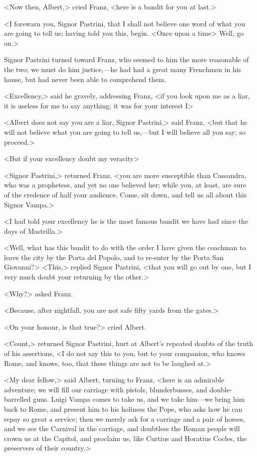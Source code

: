  <Now then, Albert,> cried Franz, <here is a bandit for you at last.> 

 <I forewarn you, Signor Pastrini, that I shall not believe one word of what you are going to tell us; having told you this, begin. <Once upon a time\longdash> Well, go on.> 

 Signor Pastrini turned toward Franz, who seemed to him the more reasonable of the two; we must do him justice,—he had had a great many Frenchmen in his house, but had never been able to comprehend them. 

 <Excellency,> said he gravely, addressing Franz, <if you look upon me as a liar, it is useless for me to say anything; it was for your interest I\longdash> 

 <Albert does not say you are a liar, Signor Pastrini,> said Franz, <but that he will not believe what you are going to tell us,—but I will believe all you say; so proceed.> 

 <But if your excellency doubt my veracity\longdash> 

 <Signor Pastrini,> returned Franz, <you are more susceptible than Cassandra, who was a prophetess, and yet no one believed her; while you, at least, are sure of the credence of half your audience. Come, sit down, and tell us all about this Signor Vampa.> 

 <I had told your excellency he is the most famous bandit we have had since the days of Mastrilla.> 

 <Well, what has this bandit to do with the order I have given the coachman to leave the city by the Porta del Popolo, and to re-enter by the Porta San Giovanni?>  <This,> replied Signor Pastrini, <that you will go out by one, but I very much doubt your returning by the other.> 

 <Why?> asked Franz. 

 <Because, after nightfall, you are not safe fifty yards from the gates.> 

 <On your honour, is that true?> cried Albert. 

 <Count,> returned Signor Pastrini, hurt at Albert's repeated doubts of the truth of his assertions, <I do not say this to you, but to your companion, who knows Rome, and knows, too, that these things are not to be laughed at.> 

 <My dear fellow,> said Albert, turning to Franz, <here is an admirable adventure; we will fill our carriage with pistols, blunderbusses, and double-barrelled guns. Luigi Vampa comes to take us, and we take him—we bring him back to Rome, and present him to his holiness the Pope, who asks how he can repay so great a service; then we merely ask for a carriage and a pair of horses, and we see the Carnival in the carriage, and doubtless the Roman people will crown us at the Capitol, and proclaim us, like Curtius and Horatius Cocles, the preservers of their country.> 

